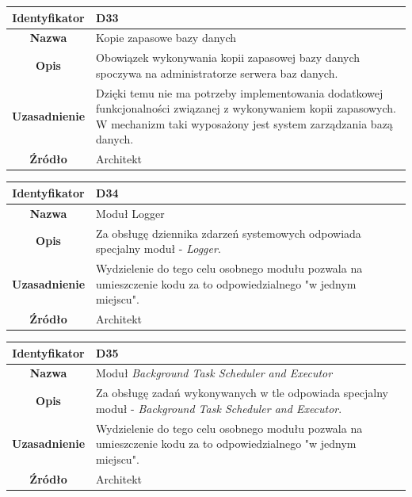 \begin{table}[H]
\centering
\begin{tabular}{ | >{\bfseries}c | p{11cm} | }
\hline
%
Identyfikator & D33 \\ \hline
Nazwa & Kopie zapasowe bazy danych \\ \hline
Opis & Obowiązek wykonywania kopii zapasowej bazy danych spoczywa na administratorze serwera baz danych. \\ \hline
Uzasadnienie & Dzięki temu nie ma potrzeby implementowania dodatkowej funkcjonalności związanej z wykonywaniem kopii zapasowych. W mechanizm taki wyposażony jest system zarządzania bazą danych. \\ \hline
Źródło & Architekt \\ \hline
%
\end{tabular}
\end{table}

\begin{table}[H]
\centering
\begin{tabular}{ | >{\bfseries}c | p{11cm} | }
\hline
%
Identyfikator & D34 \\ \hline
Nazwa & Moduł Logger \\ \hline
Opis & Za obsługę dziennika zdarzeń systemowych odpowiada specjalny moduł - \textit{Logger}. \\ \hline
Uzasadnienie & Wydzielenie do tego celu osobnego modułu pozwala na umieszczenie kodu za to odpowiedzialnego "w jednym miejscu". \\ \hline
Źródło & Architekt \\ \hline
%
\end{tabular}
\end{table}

\begin{table}[H]
\centering
\begin{tabular}{ | >{\bfseries}c | p{11cm} | }
\hline
%
Identyfikator & D35 \\ \hline
Nazwa & Moduł \textit{Background Task Scheduler and Executor} \\ \hline
Opis & Za obsługę zadań wykonywanych w tle odpowiada specjalny moduł - \textit{Background Task Scheduler and Executor}. \\ \hline
Uzasadnienie & Wydzielenie do tego celu osobnego modułu pozwala na umieszczenie kodu za to odpowiedzialnego "w jednym miejscu". \\ \hline
Źródło & Architekt \\ \hline
%
\end{tabular}
\end{table}

